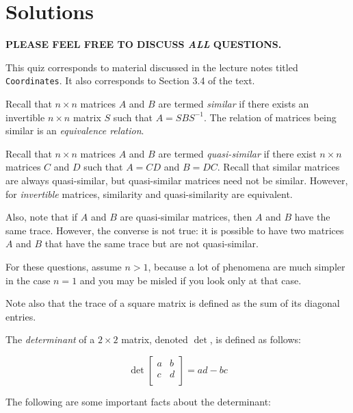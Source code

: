\documentclass[10pt]{amsart}
\begin{document}
\section{Solutions}

{\bf PLEASE FEEL FREE TO DISCUSS {\em ALL} QUESTIONS.}

This quiz corresponds to material discussed in the lecture notes
titled {\tt Coordinates}. It also corresponds to Section 3.4 of the
text.

Recall that $n \times n$ matrices $A$ and $B$ are termed {\em similar}
if there exists an invertible $n \times n$ matrix $S$ such that $A =
SBS^{-1}$. The relation of matrices being similar is an {\em
  equivalence relation}.

Recall that $n \times n$ matrices $A$ and $B$ are termed {\em
  quasi-similar} if there exist $n \times n$ matrices $C$ and $D$ such
that $A = CD$ and $B = DC$. Recall that similar matrices are always
quasi-similar, but quasi-similar matrices need not be
similar. However, for {\em invertible} matrices, similarity and
quasi-similarity are equivalent.

Also, note that if $A$ and $B$ are quasi-similar matrices, then $A$
and $B$ have the same trace. However, the converse is not true: it is
possible to have two matrices $A$ and $B$ that have the same trace but
are not quasi-similar.

For these questions, assume $n > 1$, because a lot of phenomena are
much simpler in the case $n = 1$ and you may be misled if you look
only at that case.

Note also that the trace of a square matrix is defined as the sum of
its diagonal entries.

The {\em determinant} of a $2 \times 2$ matrix, denoted $\det$, is
defined as follows:

$$\det \left[\begin{matrix} a & b \\ c & d \\\end{matrix}\right] = ad - bc$$

The following are some important facts about the determinant:
\end{document}
